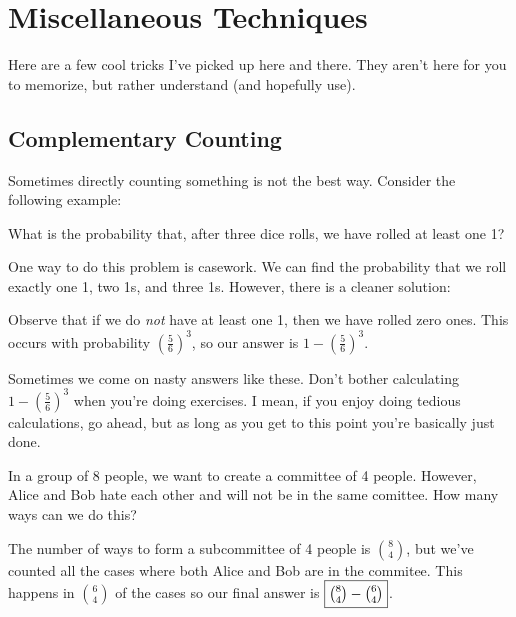 \documentclass{scrartcl}
\begin{document}
	\section{Miscellaneous Techniques}
	Here are a few cool tricks I've picked up here and there. They aren't here for you to memorize, but rather understand (and hopefully use). 

	\subsection{Complementary Counting}
	Sometimes directly counting something is not the best way. Consider the following example:
	\begin{example}
		What is the probability that, after three dice rolls, we have rolled at least one 1?
	\end{example}
	\begin{soln}
	One way to do this problem is casework. We can find the probability that we roll exactly one 1, two 1s, and three 1s. However, there is a cleaner solution:

	Observe that if we do \emph{not} have at least one 1, then we have rolled zero ones. This occurs with probability ${\left(\frac{5}{6}\right)}^3$, so our answer is $\boxed{1 - {\left(\tfrac{5}{6}\right)}^3}$.
	\end{soln}

Sometimes we come on nasty answers like these. Don't bother calculating $1 - {\left(\frac{5}{6}\right)}^3$ when you're doing exercises. I mean, if you enjoy doing tedious calculations, go ahead, but as long as you get to this point you're basically just done.
	\begin{example}
		In a group of 8 people, we want to create a committee of 4 people. However, Alice and Bob hate each other and will not be in the same comittee. How many ways can we do this?
	\end{example}
	\begin{soln}
		The number of ways to form a subcommittee of 4 people is $\binom{8}{4}$, but we've counted all the cases where both Alice and Bob are in the commitee. This happens in $\binom{6}{4}$ of the cases so our final answer is $\boxed{\tbinom{8}{4} - \tbinom{6}{4}}$.
	\end{soln}
\end{document}
